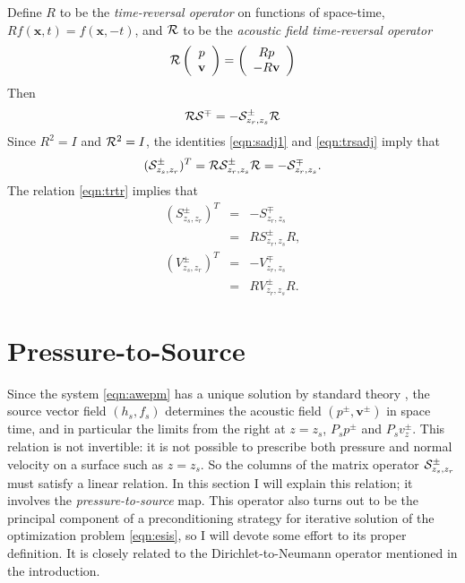 \documentclass[georeport,12pt]{geophysics}
\newcommand{\bx}{\mathbf{x}}
\newcommand{\bv}{\mathbf{v}}
\begin{document}
Define $R$ to be the {\em time-reversal operator} on functions of
space-time, $Rf(\bx,t) = f(\bx,-t)$, and ${\cal R}$ to be the {\em
  acoustic field time-reversal operator}
\begin{equation}
  \label{eqn:trdef}
  {\cal R} \left(
    \begin{array}{c}
      p\\
      \bv
    \end{array}
  \right) =
  \left(
    \begin{array}{c}
      Rp\\
      -R\bv
    \end{array}
  \right)
\end{equation}
Then 
\begin{equation}
  \label{eqn:trsadj}
  {\cal R}{\cal S}^{\mp} = -{\cal S}^{\pm}_{z_r,z_s}{\cal R}
\end{equation}
Since $R^2 = I$ and ${\cal R}^2 = I$, the identities \ref{eqn:sadj1} and \ref{eqn:trsadj} imply that
\begin{equation} 
  \label{eqn:trtr}
 ({\cal S}^{\pm}_{z_s,z_r})^T = {\cal R}{\cal S}_{z_r,z_s}^{\pm}{\cal R}=
 -{\cal S}^{\mp}_{z_r,z_s}.
\end{equation}
The relation \ref{eqn:trtr} implies that
\begin{eqnarray}
  (S^{\pm}_{z_s,z_r})^T &=& -S^{\mp}_{z_r,z_s} \nonumber\\
                        &=& R S^{\pm}_{z_r,z_s}R, \nonumber\\
    (V^{\pm}_{z_s,z_r})^T &=& -V^{\mp}_{z_r,z_s} \nonumber\\
                        &=& R V^{\pm}_{z_r,z_s}R.
                            \label{eqn:trtrcomp}
\end{eqnarray}




\section{Pressure-to-Source}

Since the system \ref{eqn:awepm} has a unique solution by standard
theory \cite[]{Lax:PDENotes}, the source vector field $(h_s,f_s)$
determines the acoustic field $(p^{\pm},\bv^{\pm})$ in space time, and
in particular the limits from the right at $z=z_s$, $P_sp^{\pm}$ and
$P_sv_z^{\pm}$. This relation is not invertible: it is not possible to
prescribe both pressure and normal velocity on a surface such as
$z=z_s$. So the columns of the matrix operator
${\cal S}^{\pm}_{z_s,z_r}$ must satisfy a linear relation. In this
section I will explain this relation; it involves the {\em
  pressure-to-source} map. This operator also turns out to be the
principal component of a preconditioning strategy for iterative
solution of the optimization problem \ref{eqn:esis}, so I will devote
some effort to its proper definition. It is closely related to the
Dirichlet-to-Neumann operator mentioned in the introduction.
\end{document}
